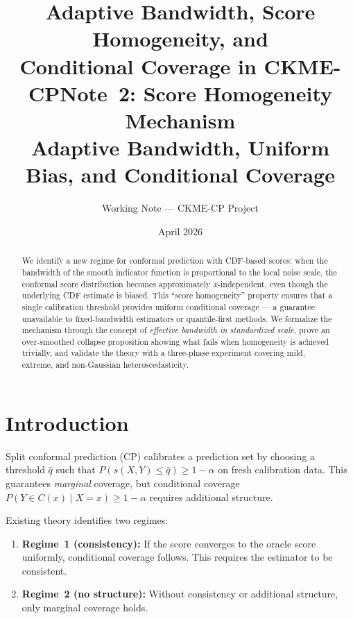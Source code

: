 \documentclass[11pt]{article}
\title{Adaptive Bandwidth, Score Homogeneity, and\\
    Conditional Coverage in CKME-CP}
\author{}
\date{}
\title{Note~2: Score Homogeneity Mechanism\\
    {\large Adaptive Bandwidth, Uniform Bias, and Conditional Coverage}}
\author{Working Note --- CKME-CP Project}
\date{April 2026}
\newif\ifpaper
\theoremstyle{remark}
\begin{document}
\maketitle

\begin{abstract}
We identify a new regime for conformal prediction with CDF-based
scores: when the bandwidth of the smooth indicator function is
proportional to the local noise scale, the conformal score distribution
becomes approximately $x$-independent, even though the underlying CDF
estimate is biased. This ``score homogeneity'' property ensures that a
single calibration threshold provides uniform conditional coverage ---
a guarantee unavailable to fixed-bandwidth estimators or
quantile-first methods. We formalize the mechanism through the concept
of \emph{effective bandwidth in standardized scale}, prove an
over-smoothed collapse proposition showing what fails when homogeneity
is achieved trivially, and validate the theory with a three-phase
experiment covering mild, extreme, and non-Gaussian heteroscedasticity.
\end{abstract}

\tableofcontents
\newpage


\ifpaper\else
\section{Introduction}
\label{sec:intro}

Split conformal prediction (CP) calibrates a prediction set by
choosing a threshold $\hat{q}$ such that
$P(s(X, Y) \le \hat{q}) \ge 1 - \alpha$ on fresh calibration data.
This guarantees \emph{marginal} coverage, but conditional coverage
$P(Y \in C(x) \mid X = x) \ge 1 - \alpha$ requires additional
structure.

Existing theory identifies two regimes:
\begin{enumerate}
  \item \textbf{Regime~1 (consistency):} If the score converges to the
    oracle score uniformly, conditional coverage follows. This requires
    the estimator to be consistent.
  \item \textbf{Regime~2 (no structure):} Without consistency or
    additional structure, only marginal coverage holds.
\end{enumerate}
\end{document}
